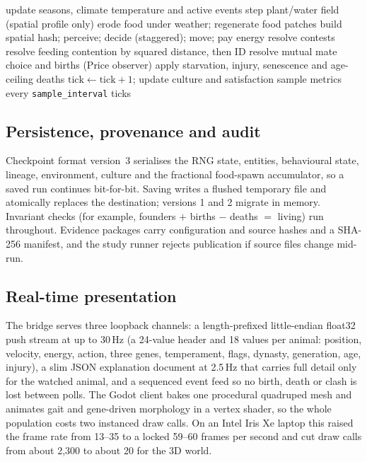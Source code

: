 \documentclass[conference]{IEEEtran}
\begin{document}
\begin{algorithm}[t]
\caption{One engine tick}
\label{alg:tick}
\small
\begin{algorithmic}[1]
\State update seasons, climate temperature and active events
\State step plant/water field (spatial profile only)
\State erode food under weather; regenerate food patches
\State build spatial hash; perceive; decide (staggered); move; pay energy
 resolve contests \EndIf
\State resolve feeding contention by squared distance, then ID
\State resolve mutual mate choice and births (Price observer)
\State apply starvation, injury, senescence and age-ceiling deaths
\State $\text{tick} \gets \text{tick}+1$; update culture and satisfaction
\State sample metrics every \texttt{sample\_interval} ticks
\end{algorithmic}
\end{algorithm}

\subsection{Persistence, provenance and audit}
Checkpoint format version~3 serialises the RNG state, entities, behavioural state,
lineage, environment, culture and the fractional food-spawn accumulator, so a
saved run continues bit-for-bit. Saving writes a flushed temporary file and
atomically replaces the destination; versions 1 and 2 migrate in memory.
Invariant checks (for example, founders $+$ births $-$ deaths $=$ living) run
throughout. Evidence packages carry configuration and source hashes and a SHA-256
manifest, and the study runner rejects publication if source files change mid-run.

\subsection{Real-time presentation}
The bridge serves three loopback channels: a length-prefixed little-endian float32
push stream at up to 30\,Hz (a 24-value header and 18 values per animal: position,
velocity, energy, action, three genes, temperament, flags, dynasty, generation,
age, injury), a slim JSON explanation document at 2.5\,Hz that carries full detail
only for the watched animal, and a sequenced event feed so no birth, death or clash
is lost between polls. The Godot client bakes one procedural quadruped mesh and
animates gait and gene-driven morphology in a vertex shader, so the whole
population costs two instanced draw calls. On an Intel Iris Xe laptop this raised
the frame rate from 13--35 to a locked 59--60 frames per second and cut draw calls
from about 2{,}300 to about 20 for the 3D world.
\end{document}
